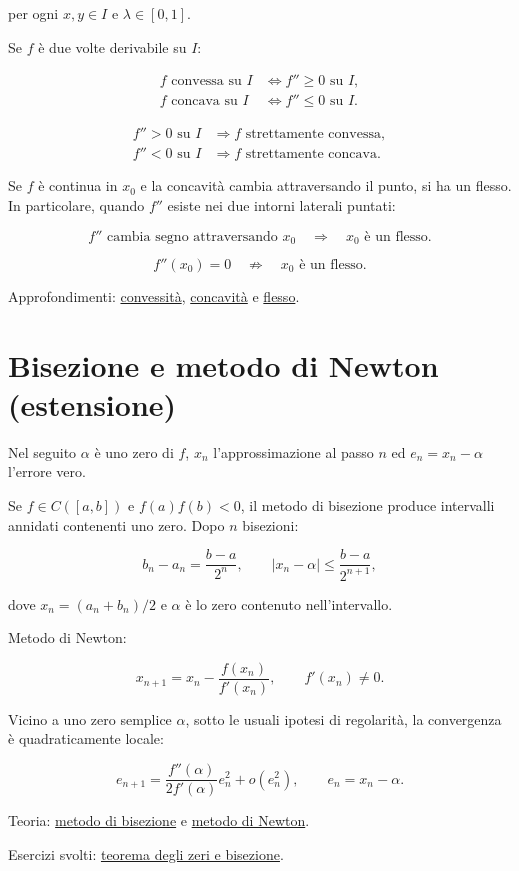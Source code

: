 per ogni \(x,y\in I\) e \(\lambda\in[0,1]\).

Se \(f\) è due volte derivabile su \(I\):

\[
\begin{aligned}
f\text{ convessa su }I&\Longleftrightarrow f''\ge0\text{ su }I,\\
f\text{ concava su }I&\Longleftrightarrow f''\le0\text{ su }I.
\end{aligned}
\]

\[
\begin{aligned}
f''>0\text{ su }I&\Longrightarrow f\text{ strettamente convessa},\\
f''<0\text{ su }I&\Longrightarrow f\text{ strettamente concava}.
\end{aligned}
\]

Se \(f\) è continua in \(x_0\) e la concavità cambia attraversando il punto, si ha un flesso. In particolare, quando \(f''\) esiste nei due intorni laterali puntati:

\[
\displaystyle
f''\text{ cambia segno attraversando }x_0
\quad\Longrightarrow\quad
x_0\text{ è un flesso}.
\]

\[
\displaystyle
f''(x_0)=0
\quad\not\Longrightarrow\quad
x_0\text{ è un flesso}.
\]

Approfondimenti: \href{https://ingegnerismo.it/matematica/convessita/}{convessità}, \href{https://ingegnerismo.it/matematica/concavita/}{concavità} e \href{https://ingegnerismo.it/matematica/flesso/}{flesso}.

\section{Bisezione e metodo di Newton (estensione)}\label{bisezione-e-metodo-di-newton-estensione}

Nel seguito \(\alpha\) è uno zero di \(f\), \(x_n\) l'approssimazione al passo \(n\) ed \(e_n=x_n-\alpha\) l'errore vero.

Se \(f\in C([a,b])\) e \(f(a)f(b)<0\), il metodo di bisezione produce intervalli annidati contenenti uno zero. Dopo \(n\) bisezioni:

\[
b_n-a_n=\frac{b-a}{2^n},
\qquad
|x_n-\alpha|\le\frac{b-a}{2^{n+1}},
\]

dove \(x_n=(a_n+b_n)/2\) e \(\alpha\) è lo zero contenuto nell'intervallo.

Metodo di Newton:

\[
x_{n+1}=x_n-\frac{f(x_n)}{f'(x_n)},
\qquad f'(x_n)\ne0.
\]

Vicino a uno zero semplice \(\alpha\), sotto le usuali ipotesi di regolarità, la convergenza è quadraticamente locale:

\[
e_{n+1}
=
\frac{f''(\alpha)}{2f'(\alpha)}e_n^2
+o(e_n^2),
\qquad e_n=x_n-\alpha.
\]

Teoria: \href{https://ingegnerismo.it/matematica/metodo-di-bisezione/}{metodo di bisezione} e \href{https://ingegnerismo.it/matematica/metodo-di-newton/}{metodo di Newton}.

Esercizi svolti: \href{https://ingegnerismo.it/matematica/teorema-degli-zeri-esercizi/}{teorema degli zeri e bisezione}.
